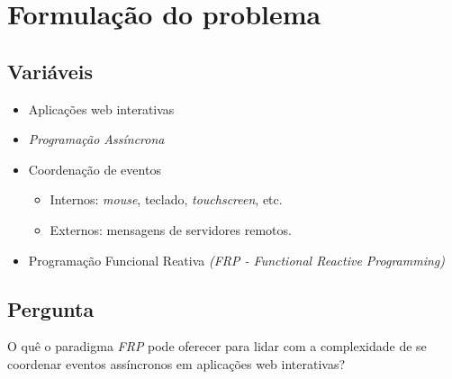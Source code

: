 \section{Formulação do problema}\label{lproblema}

\subsection{Variáveis}

\begin{itemize}[noitemsep]
  \item Aplicações web interativas
  \item \textit{Programação Assíncrona}
  \item Coordenação de eventos
    \begin{itemize}[noitemsep]
      \item Internos: \textit{mouse}, teclado, \textit{touchscreen}, etc.
      \item Externos: mensagens de servidores remotos.
    \end{itemize}
  \item Programação Funcional Reativa \emph{(FRP - Functional Reactive Programming)}
\end{itemize}


\subsection{Pergunta}

O quê o paradigma \emph{FRP}
pode oferecer para lidar com a complexidade de se coordenar
eventos assíncronos em aplicações web interativas?

